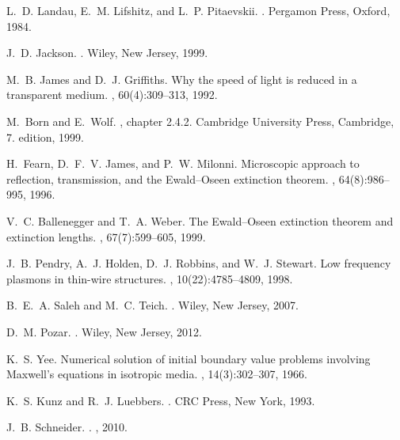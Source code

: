 \documentclass[prb,twocolumn]{revtex4-1}
\begin{document}
%
\def\cprime{$'$}
\begin{thebibliography}{10}

L.~D. Landau, E.~M. Lifshitz, and L.~P. Pitaevskii.
.
\newblock Pergamon Press, Oxford, 1984.

J.~D. Jackson.
.
\newblock Wiley, New Jersey, 1999.

M.~B. James and D.~J. Griffiths.
\newblock Why the speed of light is reduced in a transparent medium.
, 60(4):309--313, 1992.

M.~Born and E.~Wolf.
, chapter 2.4.2.
\newblock Cambridge University Press, Cambridge, 7. edition, 1999.

H.~Fearn, D.~F.~V. James, and P.~W. Milonni.
\newblock Microscopic approach to reflection, transmission, and the
  {Ewald}--{Oseen} extinction theorem.
, 64(8):986--995, 1996.

V.~C. Ballenegger and T.~A. Weber.
\newblock The {Ewald}--{Oseen} extinction theorem and extinction lengths.
, 67(7):599--605, 1999.

J.~B. Pendry, A.~J. Holden, D.~J. Robbins, and W.~J. Stewart.
\newblock Low frequency plasmons in thin-wire structures.
, 10(22):4785--4809, 1998.

B.~E.~A. Saleh and M.~C. Teich.
.
\newblock Wiley, New Jersey, 2007.

D.~M. Pozar.
.
\newblock Wiley, New Jersey, 2012.

K.~S. Yee.
\newblock Numerical solution of initial boundary value problems involving
  {M}axwell's equations in isotropic media.
, 14(3):302--307, 1966.

K.~S. Kunz and R.~J. Luebbers.
.
\newblock CRC Press, New York, 1993.

J.~B. Schneider.
.
, 2010.

\end{thebibliography}
\end{document}
